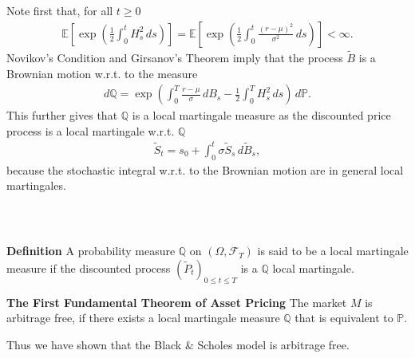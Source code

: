 \documentclass{beamer}
\numberwithin{equation}{section}
\newenvironment{frame2}{\begin{frame}\frametitle{{\normalsize \secname} \\ {\large \subsecname}}}{\end{frame}}
\begin{document}
\begin{frame2}
    Note first that, for all $t \geq 0$
    \begin{align*}
        \mathbb{E}\left[\exp\left(\frac{1}{2}\int_0^t H_s^2 \, ds\right)\right] = \mathbb{E}\left[\exp\left(\frac{1}{2}\int_0^t \frac{(r - \mu)^2}{\sigma^2} \, ds\right)\right] < \infty.
    \end{align*}
    Novikov's Condition and Girsanov's Theorem imply that the process $\tilde{B}$ is a Brownian motion w.r.t.\! to the measure
    \begin{align}
        d\mathbb{Q} = \exp\left(\int_0^T \frac{r - \mu}{\sigma}\, dB_s - \frac{1}{2}\int_0^T H_s^2 \, ds\right) \, d\mathbb{P}.
    \end{align}
    This further gives that $\mathbb{Q}$ is a local martingale measure as the discounted price process is a local martingale w.r.t. $\mathbb{Q}$
    \begin{align}
        \tilde{S}_t = s_0 + \int_0^t\sigma\tilde{S}_s \, d\tilde{B}_s,
    \end{align}
    because the stochastic integral w.r.t.\! to the Brownian motion are in general local martingales. 
\end{frame2}

\begin{frame2}
    \textbf{Definition}\newline
    A probability measure $\mathbb{Q}$ on $(\Omega,\mathscr{F}_T)$ is said to be a local martingale measure if the discounted process $(\tilde{P}_t)_{0\leq t \leq T}$ is a $\mathbb{Q}$ local martingale.

    \vspace{10pt}
    \textbf{The First Fundamental Theorem of Asset Pricing}\newline
    The market $M$ is arbitrage free, if there exists a local martingale measure $\mathbb{Q}$ that is equivalent to $\mathbb{P}$.

    \vspace{10pt}
    Thus we have shown that the Black \& Scholes model is arbitrage free.
\end{frame2}
\end{document}
